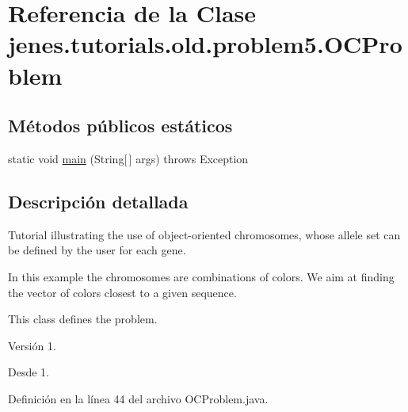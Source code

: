 \hypertarget{classjenes_1_1tutorials_1_1old_1_1problem5_1_1_o_c_problem}{\section{Referencia de la Clase jenes.\-tutorials.\-old.\-problem5.\-O\-C\-Problem}
\label{classjenes_1_1tutorials_1_1old_1_1problem5_1_1_o_c_problem}
}
\subsection*{Métodos públicos estáticos}
\begin{DoxyCompactItemize}
\item 
static void \hyperlink{classjenes_1_1tutorials_1_1old_1_1problem5_1_1_o_c_problem_afb39fb22d5193f3dd2c7bcd0db99cee4}{main} (String\mbox{[}$\,$\mbox{]} args)  throws Exception 
\end{DoxyCompactItemize}


\subsection{Descripción detallada}
Tutorial illustrating the use of object-\/oriented chromosomes, whose allele set can be defined by the user for each gene.

In this example the chromosomes are combinations of colors. We aim at finding the vector of colors closest to a given sequence.

This class defines the problem.

\begin{DoxyVersion}{Versión}
1. 
\end{DoxyVersion}
\begin{DoxySince}{Desde}
1. 
\end{DoxySince}


Definición en la línea 44 del archivo O\-C\-Problem.\-java.



